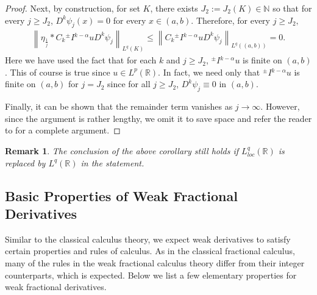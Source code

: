 \documentclass[leqno,final]{siamltex}
\numberwithin{equation}{section}
\newtheorem{remark}{Remark}[section]
\renewcommand{\(}{\bigl(}
\renewcommand{\)}{\bigr)}
\newcommand{\R}{\mathbb{R}}
\newcommand{\N}{\mathbb{N}}
\begin{document}
\begin{proof}
            Next, by construction, for set $K$, there exists $J_{2}:= J_{2}(K) \in \N$ so that for every $j\geq J_{2}$, $D^{k} \psi_j(x) = 0$ for every $x \in (a,b)$. Therefore, for every $j \geq J_{2},$
            \begin{align*}
                \left\|\eta_{\frac{1}{j}} * C_{k} {^{\pm}}{I}{^{k-\alpha}} u D^{k}\psi_j \right\|_{L^{q}(K)} 
                \leq \left\|C_{k} {^{\pm}}{I}{^{k-\alpha}} u D^{k} \psi_j\right\|_{L^{q}((a,b))} = 0.
            \end{align*}
            Here we have used  the fact that for each $k$ and $j \geq J_{2}$, ${^{\pm}}{I}{^{k-\alpha}} u$ is finite on $(a,b)$. This of course is true since $u \in L^{p}(\R)$. In fact, we need only that ${^{\pm}}{I}{^{k-\alpha}} u$ is finite on $(a,b)$ for $j = J_{2}$ since for all $j \geq J_{2}$, $D^{k} \psi_{j} \equiv 0$ in $(a,b)$. 

            Finally, it can be shown that the remainder term vanishes as 
            $j\rightarrow \infty$. However, since the argument is rather lengthy, 
            	we omit it to save space and refer the reader  
            	to \cite[Corollary 4.2]{Feng_Sutton} for a complete argument.  
        \end{proof}
     
   
    \begin{remark}
    	The conclusion of the above corollary still holds if $L^q_{loc}(\R)$ is replaced by $L^q(\R)$ in the statement. 
    \end{remark}


    \subsection{Basic Properties of Weak Fractional Derivatives}\label{sec-4.4}  
    Similar to the classical calculus theory, we expect weak derivatives 
    to satisfy certain properties and rules 
    of calculus. As in the classical fractional calculus, many of the rules in the weak fractional calculus theory differ 
    from their integer counterparts, which is expected. Below we list a few elementary properties for weak fractional derivatives.
    
\end{document}
